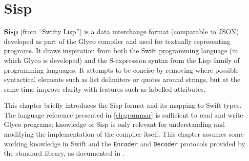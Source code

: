 \documentclass[main.tex]{subfiles}
\begin{document}
\onlyinsubfile{\mainmatter{}\appendix{}}

\chapter{Sisp} \label{ch:sisp}
\textbf{Sisp} (from \enquote{Swifty Lisp}) is a data interchange format (comparable to JSON) developed as part of the Glyco compiler and used for textually representing programs. It draws inspiration from both the Swift programming language (in which Glyco is developed) and the S-expression syntax from the Lisp family of programming languages. It attempts to be concise by removing where possible syntactical elements such as list delimiters or quotes around strings, but at the same time improve clarity with features such as labelled attributes.

This chapter briefly introduces the Sisp format and its mapping to Swift types. The language reference presented in \cref{ch:grammar} is sufficient to read and write Glyco programs; knowledge of Sisp is only relevant for understanding and modifying the implementation of the compiler itself. This chapter assumes some working knowledge in Swift and the \texttt{Encoder} and \texttt{Decoder} protocols provided by the standard library, as documented in \cite{swiftcoding}.
\end{document}
